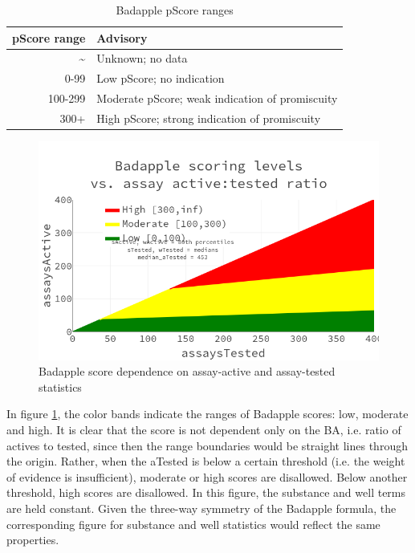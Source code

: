 \begin{table}
\caption{Badapple pScore ranges}
\begin{center}
\begin{tabular}{ |r|l| } 
\hline
\textbf{pScore range} & \textbf{Advisory} \\
\hline
\~{} & Unknown; no data \\
0-99 & Low pScore; no indication \\
100-299 & Moderate pScore; weak indication of promiscuity \\
300+ & High pScore; strong indication of promiscuity \\
\hline
\end{tabular}
\end{center}
\label{table:ba_ranges}
\end{table}

\begin{figure}
	\includegraphics[width=\textwidth]{figures/badapple/badapple_formula.png}
	\caption{Badapple score dependence on assay-active and assay-tested statistics}
	\label{fig:BA_01}
\end{figure}

In figure \ref{fig:BA_01}, the color bands indicate the ranges of Badapple scores: low, moderate and high. It is clear that the score is not dependent only on the BA, i.e. ratio of actives to tested, since then the range boundaries would be straight lines through the origin. Rather, when the aTested is below a certain threshold (i.e. the weight of evidence is insufficient), moderate or high scores are disallowed. Below another threshold, high scores are disallowed. In this figure, the substance and well terms are held constant. Given the three-way symmetry of the Badapple formula, the corresponding figure for substance and well statistics would reflect the same properties.

